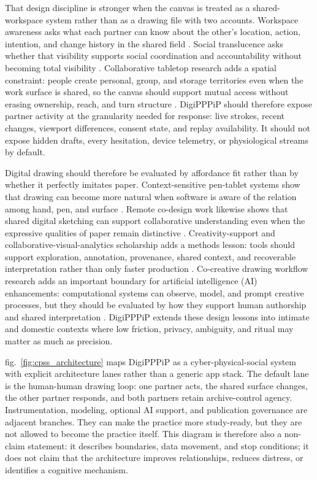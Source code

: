 \documentclass[
  english,
]{article}
\begin{document}
That design discipline is stronger when the canvas is treated as a
shared-workspace system rather than as a drawing file with two accounts.
Workspace awareness asks what each partner can know about the other's
location, action, intention, and change history in the shared field
\citep{gutwin2002workspaceawareness}. Social translucence asks whether
that visibility supports social coordination and accountability without
becoming total visibility \citep{erickson2000socialtranslucence}.
Collaborative tabletop research adds a spatial constraint: people create
personal, group, and storage territories even when the work surface is
shared, so the canvas should support mutual access without erasing
ownership, reach, and turn structure \citep{scott2004territoriality}.
DigiPPPiP should therefore expose partner activity at the granularity
needed for response: live strokes, recent changes, viewport differences,
consent state, and replay availability. It should not expose hidden
drafts, every hesitation, device telemetry, or physiological streams by
default.

Digital drawing should therefore be evaluated by affordance fit rather
than by whether it perfectly imitates paper. Context-sensitive
pen-tablet systems show that drawing can become more natural when
software is aware of the relation among hand, pen, and surface
\citep{sun2011pentablet}. Remote co-design work likewise shows that
shared digital sketching can support collaborative understanding even
when the expressive qualities of paper remain distinctive
\citep{close2024codesign}. Creativity-support and
collaborative-visual-analytics scholarship adds a methods lesson: tools
should support exploration, annotation, provenance, shared context, and
recoverable interpretation rather than only faster production
\citep{shneiderman2007creativity, heer2008collaborativeva}. Co-creative
drawing workflow research adds an important boundary for artificial
intelligence (AI) enhancements: computational systems can observe,
model, and prompt creative processes, but they should be evaluated by
how they support human authorship and shared interpretation
\citep{jansen2021cocreative}. DigiPPPiP extends these design lessons
into intimate and domestic contexts where low friction, privacy,
ambiguity, and ritual may matter as much as precision.

fig.~\ref{fig:cpss_architecture} maps DigiPPPiP as a
cyber-physical-social system with explicit architecture lanes rather
than a generic app stack. The default lane is the human-human drawing
loop: one partner acts, the shared surface changes, the other partner
responds, and both partners retain archive-control agency.
Instrumentation, modeling, optional AI support, and publication
governance are adjacent branches. They can make the practice more
study-ready, but they are not allowed to become the practice itself.
This diagram is therefore also a non-claim statement: it describes
boundaries, data movement, and stop conditions; it does not claim that
the architecture improves relationships, reduces distress, or identifies
a cognitive mechanism.
\end{document}
